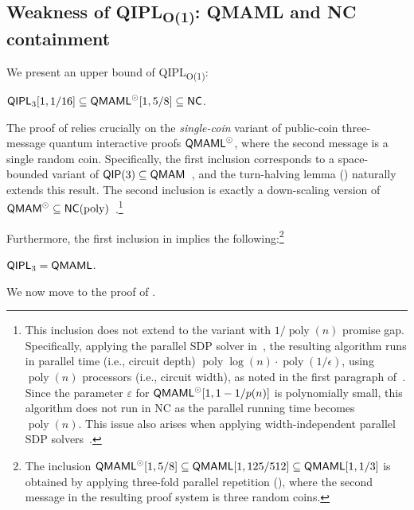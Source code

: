 \documentclass[11pt, a4paper]{article}
\numberwithin{equation}{section}
\numberwithin{figure}{section}
\newcommand{\QIP}{\textnormal{\textsf{QIP}}\xspace}
\newcommand{\QMAM}{\textnormal{\textsf{QMAM}}\xspace}
\newcommand{\QIPL}{\textnormal{\textsf{QIPL}}\xspace}
\newcommand{\QMAML}{\textnormal{\textsf{QMAML}}\xspace}
\newcommand{\QIPLconst}{\texorpdfstring{\textnormal{\textsf{QIPL}\textsubscript{O(1)}}}\xspace}
\newcommand{\NC}{\textnormal{\textsf{NC}}\xspace}
\DeclareMathOperator\poly{poly}
\begin{document}
\subsection{Weakness of \QIPLconst{}: \QMAML{} and \NC{} containment}
\label{subsec:NC-cointainment}

We present an upper bound of \QIPLconst{}: 

\begin{lemma}
    \label{lemma:QIPL3-in-NC}
    $\QIPL_3[1,1/16] \subseteq \QMAML^{\odot}[1,5/8] \subseteq \NC$. 
\end{lemma}

The proof of  relies crucially on the \textit{single-coin} variant of public-coin three-message quantum interactive proofs $\QMAML^{\odot}$, where the second message is a single random coin. 
Specifically, the first inclusion corresponds to a space-bounded variant of $\QIP(3) \subseteq \QMAM$~\cite[Section 5]{MW05}, and the turn-halving lemma () naturally extends this result. 
The second inclusion is exactly a down-scaling version of $\QMAM^{\odot} \subseteq \NC(\poly)$~\cite{JJUW11}.\footnote{This inclusion does not extend to the variant with $1/\poly(n)$ promise gap. Specifically, applying the parallel SDP solver in~\cite{JJUW11}, the resulting algorithm runs in parallel time (i.e., circuit depth) $\poly\log(n) \cdot \poly(1/\epsilon)$, using $\poly(n)$ processors (i.e., circuit width), as noted in the first paragraph of~\cite{JY11}. Since the parameter $\varepsilon$ for $\QMAML^{\odot}[1,1-1/p(n)]$ is polynomially small, this algorithm does not run in \NC{} as the parallel running time becomes $\poly(n)$. This issue also arises when applying width-independent parallel SDP solvers~\cite{JY11,AZLO16}.\label{footref:precision-in-parallel-SDP-solvers}}

Furthermore, the first inclusion in  implies the following:\footnote{The inclusion $\QMAML^{\odot}[1,5/8] \subseteq \QMAML[1,125/512] \subseteq \QMAML[1,1/3]$ is obtained by applying three-fold parallel repetition (), where the second message in the resulting proof system is three random coins. } 

\begin{corollary}
    \label{corr:QIPL3-eq-QMAML}
    $\QIPL_3 = \QMAML$. 
\end{corollary}

We now move to the proof of . 
\end{document}
